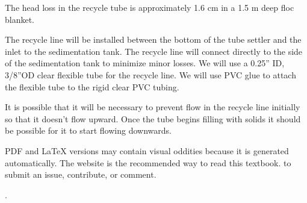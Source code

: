 \documentclass[letterpaper,10pt,english]{sphinxmanual}
\begin{document}
The head loss in the recycle tube is approximately 1.6 cm in a 1.5 m deep floc blanket.

The recycle line will be installed between the bottom of the tube settler and the inlet to the sedimentation tank. The recycle line will connect  directly to the side of the sedimentation tank to minimize minor losses. We will use a 0.25” ID, 3/8”OD clear flexible tube for the recycle line. We will use PVC glue to attach the flexible tube to the rigid clear PVC tubing.

It is possible that it will be necessary to prevent flow in the recycle line initially so that it doesn’t flow upward. Once the tube begins filling with solids it should be possible for it to start flowing downwards.

\begin{footnote}[1]\sphinxAtStartFootnote
PDF and LaTeX versions may contain visual oddities because it is generated automatically. The website is the recommended way to read this textbook.  to submit an issue, contribute, or comment.
%
\end{footnote}.
\paragraph{}



\renewcommand{\indexname}{Index}
\printindex
\end{document}
